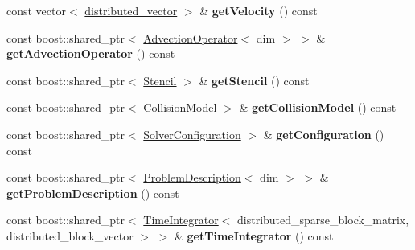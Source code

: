 \begin{DoxyCompactItemize}
\item 
\hypertarget{classnatrium_1_1CFDSolver_a0e5ec3dc278216d5827410b7db82af59}{
const vector$<$ \hyperlink{namespacenatrium_a903d2b92917f582f2ff05f52160ab811}{distributed\_\-vector} $>$ \& {\bfseries getVelocity} () const }
\label{classnatrium_1_1CFDSolver_a0e5ec3dc278216d5827410b7db82af59}

\item 
\hypertarget{classnatrium_1_1CFDSolver_a20e897531387c33b60a2e3c18e61c243}{
const boost::shared\_\-ptr$<$ \hyperlink{classnatrium_1_1AdvectionOperator}{AdvectionOperator}$<$ dim $>$ $>$ \& {\bfseries getAdvectionOperator} () const }
\label{classnatrium_1_1CFDSolver_a20e897531387c33b60a2e3c18e61c243}

\item 
\hypertarget{classnatrium_1_1CFDSolver_a5ef0f693bf6c7b72f17d8564b4069ce8}{
const boost::shared\_\-ptr$<$ \hyperlink{classnatrium_1_1Stencil}{Stencil} $>$ \& {\bfseries getStencil} () const }
\label{classnatrium_1_1CFDSolver_a5ef0f693bf6c7b72f17d8564b4069ce8}

\item 
\hypertarget{classnatrium_1_1CFDSolver_af573bd22cb7dff697dc5db99819f79c8}{
const boost::shared\_\-ptr$<$ \hyperlink{classnatrium_1_1CollisionModel}{CollisionModel} $>$ \& {\bfseries getCollisionModel} () const }
\label{classnatrium_1_1CFDSolver_af573bd22cb7dff697dc5db99819f79c8}

\item 
\hypertarget{classnatrium_1_1CFDSolver_a819a073ab7ac1d33a0968ca0ffc6eba4}{
const boost::shared\_\-ptr$<$ \hyperlink{classnatrium_1_1SolverConfiguration}{SolverConfiguration} $>$ \& {\bfseries getConfiguration} () const }
\label{classnatrium_1_1CFDSolver_a819a073ab7ac1d33a0968ca0ffc6eba4}

\item 
\hypertarget{classnatrium_1_1CFDSolver_ad728be4103a49d1801e3b26e0e15e944}{
const boost::shared\_\-ptr$<$ \hyperlink{classnatrium_1_1ProblemDescription}{ProblemDescription}$<$ dim $>$ $>$ \& {\bfseries getProblemDescription} () const }
\label{classnatrium_1_1CFDSolver_ad728be4103a49d1801e3b26e0e15e944}

\item 
\hypertarget{classnatrium_1_1CFDSolver_a3673200a69c114982ef389eaa0ffffc5}{
const boost::shared\_\-ptr$<$ \hyperlink{classnatrium_1_1TimeIntegrator}{TimeIntegrator}$<$ distributed\_\-sparse\_\-block\_\-matrix, distributed\_\-block\_\-vector $>$ $>$ \& {\bfseries getTimeIntegrator} () const }
\label{classnatrium_1_1CFDSolver_a3673200a69c114982ef389eaa0ffffc5}


\end{DoxyCompactItemize}
